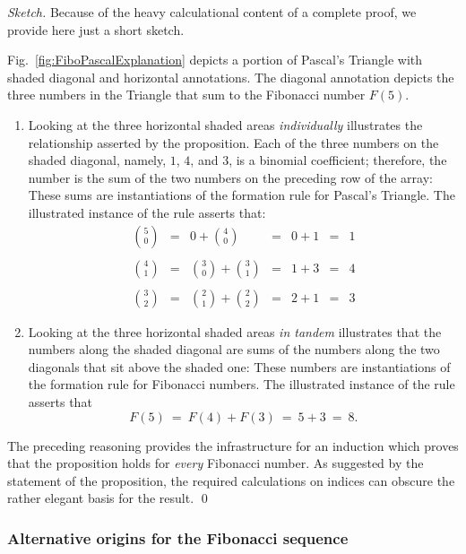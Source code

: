 \begin{proof}[Sketch]
Because of the heavy calculational content of a complete proof, we provide here just a short sketch.

\smallskip

Fig.~\ref{fig:FiboPascalExplanation} depicts a portion of Pascal's Triangle with shaded diagonal and horizontal annotations.  The diagonal annotation depicts the three numbers in the Triangle that sum to the Fibonacci number $F(5)$.
\begin{enumerate}
\item
Looking at the three horizontal shaded areas {\em individually} illustrates the relationship asserted by the proposition.  Each of the three numbers on the shaded diagonal, namely, $1$, $4$, and  $3$, is a binomial coefficient; therefore, the number is the sum of the two numbers on the preceding row of the array: These sums are instantiations of the formation rule for Pascal's Triangle.  The illustrated instance of the rule asserts that:
\[
\begin{array}{ccccccc}
{\displaystyle {5 \choose 0}}
 & = &
{\displaystyle 0 + {4 \choose 0} }
 & = &
0 + 1
 & = & 1 \\ \\
{\displaystyle {4 \choose 1}}
 & = &
{\displaystyle {3 \choose 0} + {3 \choose 1} }
 & = &
1 + 3
 & = & 4 \\ \\
{\displaystyle {3 \choose 2}}
 & = &
{\displaystyle {2 \choose 1} + {2 \choose 2} }
 & = &
2 + 1
 & = & 3
\end{array}
\]
\medskip\item
Looking at the three horizontal shaded areas {\em in tandem} illustrates that the numbers along the shaded diagonal are sums of the numbers along the two diagonals that sit above the shaded one:  These numbers are instantiations of the formation rule for Fibonacci numbers.  The
illustrated instance of the rule asserts that
\[ F(5) \ = \ F(4) + F(3) \ = \ 5 + 3 \ = \ 8. \]
\end{enumerate}

The preceding reasoning provides the infrastructure for an induction which proves that the proposition holds for {\em every} Fibonacci number.  As suggested by the statement of the proposition, the required calculations on indices can obscure the rather elegant basis for the result.  \qed
\end{proof}

\subsubsection{Alternative origins for the Fibonacci sequence}
\label{sec:Fibonacci-other-recurrences}


